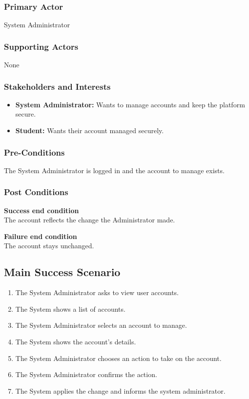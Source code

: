 \documentclass[10pt,letterpaper]{article}
\begin{document}
\subsubsection*{Primary Actor}
System Administrator

\subsubsection*{Supporting Actors}
None

\subsubsection*{Stakeholders and Interests}
\begin{itemize}
    \item \textbf{System Administrator:} Wants to manage accounts and keep the platform secure.
    \item \textbf{Student:} Wants their account managed securely.
\end{itemize}

\subsubsection*{Pre-Conditions}
The System Administrator is logged in and the account to manage exists.

\subsubsection*{Post Conditions}

\textbf{Success end condition}\\
The account reflects the change the Administrator made.

\textbf{Failure end condition}\\
The account stays unchanged.

\subsection*{Main Success Scenario}
\begin{enumerate}
    \item The System Administrator asks to view user accounts.
    \item The System shows a list of accounts.
    \item The System Administrator selects an account to manage.
    \item The System shows the account's details.
    \item The System Administrator chooses an action to take on the account.
    \item The System Administrator confirms the action.
    \item The System applies the change and informs the system administrator.
\end{enumerate}
\end{document}
